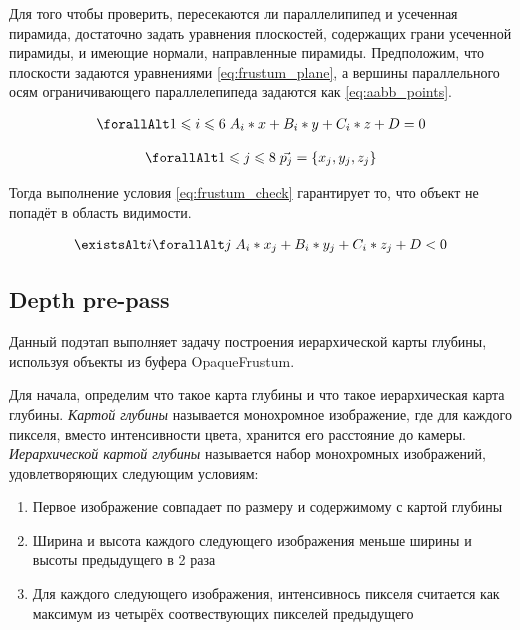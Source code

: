 		Для того чтобы проверить, пересекаются ли параллелипипед и усеченная пирамида, достаточно задать уравнения плоскостей, содержащих грани усеченной пирамиды, и имеющие нормали, направленные  пирамиды. Предположим, что плоскости задаются уравнениями \ref{eq:frustum_plane}, а вершины параллельного осям ограничивающего параллелепипеда задаются как \ref{eq:aabb_points}.
		
		\begin{equation} %
			\label{eq:frustum_plane}
			\begin{multlined}
				\forallAlt 1 \le i \le 6 \; A_i * x + B_i * y + C_i * z + D = 0
			\end{multlined}
		\end{equation}
		
		\begin{equation} %
			\label{eq:aabb_points}
			\begin{multlined}
				\forallAlt 1 \le j \le 8 \; \vec{p_j} = \{x_j, y_j, z_j\}
			\end{multlined}
		\end{equation}
		
		Тогда выполнение условия \ref{eq:frustum_check} гарантирует то, что объект не попадёт в область видимости.
		
		\begin{equation} %
			\label{eq:frustum_check}
			\begin{multlined}
				\existsAlt i \forallAlt j \; A_i * x_j + B_i * y_j + C_i * z_j + D < 0
			\end{multlined}
		\end{equation}
				
	\subsection{Depth pre-pass} \label{ch3:pre_pass:depth}
		Данный подэтап выполняет задачу построения иерархической карты глубины, используя объекты из буфера OpaqueFrustum.
		
		Для начала, определим что такое карта глубины и что такое иерархическая карта глубины. \textit{Картой глубины} называется монохромное изображение, где для каждого пикселя, вместо интенсивности цвета, хранится его расстояние до камеры.  \textit{Иерархической картой глубины} называется набор монохромных изображений, удовлетворяющих следующим условиям:
		\begin{enumerate}[1.]
			\item Первое изображение совпадает по размеру и содержимому с картой глубины
			\item Ширина и высота каждого следующего изображения меньше ширины и высоты предыдущего в 2 раза
			\item Для каждого следующего изображения, интенсивнось пикселя считается как максимум из четырёх соотвествующих пикселей предыдущего
		\end{enumerate}
	

